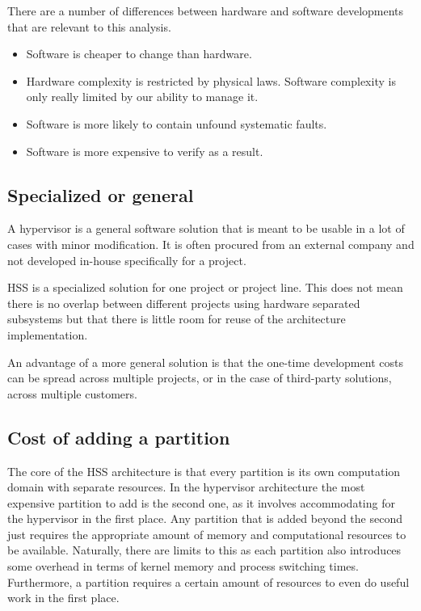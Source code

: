 There are a number of differences between hardware and software developments that are relevant to this analysis.
\begin{itemize}
\item Software is cheaper to change than hardware. 
\item Hardware complexity is restricted by physical laws. Software complexity is only really limited by our ability to manage it.
\item Software is more likely to contain unfound systematic faults.
\item Software is more expensive to verify as a result.
\end{itemize}
\subsection{Specialized or general}
A hypervisor is a general software solution that is meant to be usable in a lot of cases with minor modification. It is often procured from an external company and not developed in-house specifically for a project.

\gls{HSS} is a specialized solution for one project or project line. This does not mean there is no overlap between different projects using hardware separated subsystems but that there is little room for reuse of the architecture implementation.

An advantage of a more general solution is that the one-time development costs can be spread across multiple projects, or in the case of third-party solutions, across multiple customers.   
\subsection{Cost of adding a partition}
The core of the \gls{HSS} architecture is that every partition is its own computation domain with separate resources. In the hypervisor architecture the most expensive partition to add is the second one, as it involves accommodating for the hypervisor in the first place. Any partition that is added beyond the second just requires the appropriate amount of memory and computational resources to be available. Naturally, there are limits to this as each partition also introduces some overhead in terms of kernel memory and process switching times.  Furthermore, a partition requires a certain amount of resources to even do useful work in the first place.

